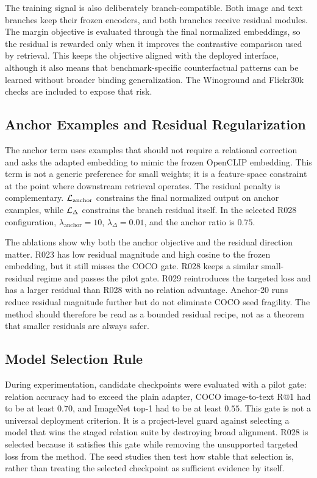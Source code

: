 The training signal is also deliberately branch-compatible. Both image and text branches keep their frozen encoders, and both branches receive residual modules. The margin objective is evaluated through the final normalized embeddings, so the residual is rewarded only when it improves the contrastive comparison used by retrieval. This keeps the objective aligned with the deployed interface, although it also means that benchmark-specific counterfactual patterns can be learned without broader binding generalization. The Winoground and Flickr30k checks are included to expose that risk.

\subsection{Anchor Examples and Residual Regularization}

The anchor term uses examples that should not require a relational correction and asks the adapted embedding to mimic the frozen OpenCLIP embedding. This term is not a generic preference for small weights; it is a feature-space constraint at the point where downstream retrieval operates. The residual penalty is complementary. $\mathcal{L}_{\mathrm{anchor}}$ constrains the final normalized output on anchor examples, while $\mathcal{L}_{\Delta}$ constrains the branch residual itself. In the selected R028 configuration, $\lambda_{\mathrm{anchor}}=10$, $\lambda_{\Delta}=0.01$, and the anchor ratio is $0.75$.

The ablations show why both the anchor objective and the residual direction matter. R023 has low residual magnitude and high cosine to the frozen embedding, but it still misses the COCO gate. R028 keeps a similar small-residual regime and passes the pilot gate. R029 reintroduces the targeted loss and has a larger residual than R028 with no relation advantage. Anchor-20 runs reduce residual magnitude further but do not eliminate COCO seed fragility. The method should therefore be read as a bounded residual recipe, not as a theorem that smaller residuals are always safer.

\subsection{Model Selection Rule}

During experimentation, candidate checkpoints were evaluated with a pilot gate: relation accuracy had to exceed the plain adapter, COCO image-to-text R@1 had to be at least $0.70$, and ImageNet top-1 had to be at least $0.55$. This gate is not a universal deployment criterion. It is a project-level guard against selecting a model that wins the staged relation suite by destroying broad alignment. R028 is selected because it satisfies this gate while removing the unsupported targeted loss from the method. The seed studies then test how stable that selection is, rather than treating the selected checkpoint as sufficient evidence by itself.

